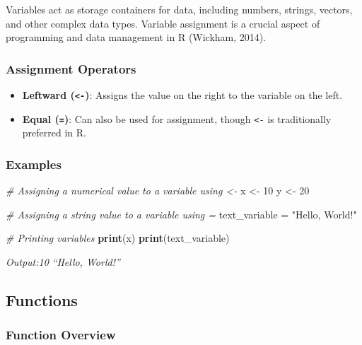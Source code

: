 \documentclass[
]{book}
\newenvironment{Shaded}{\begin{snugshade}}{\end{snugshade}}
\newcommand{\CommentTok}[1]{\textcolor[rgb]{0.56,0.35,0.01}{\textit{#1}}}
\newcommand{\DecValTok}[1]{\textcolor[rgb]{0.00,0.00,0.81}{#1}}
\newcommand{\FunctionTok}[1]{\textcolor[rgb]{0.13,0.29,0.53}{\textbf{#1}}}
\newcommand{\NormalTok}[1]{#1}
\newcommand{\OtherTok}[1]{\textcolor[rgb]{0.56,0.35,0.01}{#1}}
\newcommand{\StringTok}[1]{\textcolor[rgb]{0.31,0.60,0.02}{#1}}
\providecommand{\tightlist}{%
  \setlength{\itemsep}{0pt}\setlength{\parskip}{0pt}}
\begin{document}
Variables act as storage containers for data, including numbers, strings, vectors, and other complex data types. Variable assignment is a crucial aspect of programming and data management in R (Wickham, 2014).

\subsubsection*{Assignment Operators}\label{assignment-operators}

\begin{itemize}
\tightlist
\item
  \textbf{Leftward (\texttt{\textless{}-})}: Assigns the value on the right to the variable on the left.
\item
  \textbf{Equal (\texttt{=})}: Can also be used for assignment, though \texttt{\textless{}-} is traditionally preferred in R.
\end{itemize}

\subsubsection*{Examples}\label{examples-1}

\begin{Shaded}
\begin{Highlighting}[]
\CommentTok{\# Assigning a numerical value to a variable using \textless{}{-}}
\NormalTok{x }\OtherTok{\textless{}{-}} \DecValTok{10}
\NormalTok{y }\OtherTok{\textless{}{-}} \DecValTok{20}

\CommentTok{\# Assigning a string value to a variable using =}
\NormalTok{text\_variable }\OtherTok{=} \StringTok{"Hello, World!"}

\CommentTok{\# Printing variables}
\FunctionTok{print}\NormalTok{(x)}
\FunctionTok{print}\NormalTok{(text\_variable)}
\end{Highlighting}
\end{Shaded}

\emph{Output:10} \emph{``Hello, World!''}

\subsection*{Functions}\label{functions}

\subsubsection*{Function Overview}\label{function-overview}
\end{document}
